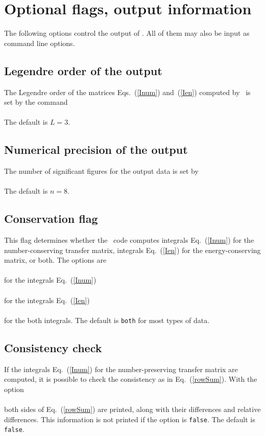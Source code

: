 \section{Optional flags, output information}
\label{Sec:usage-optional}
The following options control the output of \gettransfer.
All of them may also be input as command line options.

\subsection{Legendre order of the output}\label{Sec:LegendreOrder}
The Legendre order of the matrices Eqs.~(\ref{Inum}) and~(\ref{Ien})
computed by \gettransfer\ is set by the command\\
  \\
The default is $L = 3$.

\subsection{Numerical precision of the output}
The number of significant figures for the output data is set by\\
  \\
The default is $n = 8$.

\subsection{Conservation flag}\label{Sec:conserveFlag}
This flag determines whether the \gettransfer\ code computes integrals
   Eq.~(\ref{Inum}) for the number-conserving transfer matrix,
   integrals  Eq.~(\ref{Ien}) for the energy-conserving matrix, or both.
   The options are\\
   \\
for the integrals Eq.~(\ref{Inum})\\
   \\
for the integrals Eq.~(\ref{Ien})\\
   \\
for the both integrals.  The default is \texttt{both} for most types of data.

\subsection{Consistency check}
If the integrals Eq.~(\ref{Inum}) for the number-preserving transfer matrix
are computed, it is possible to check the consistency as in Eq.~(\ref{rowSum}).
With the option\\
  \\
both sides of Eq.~(\ref{rowSum}) are printed, along with their differences
and relative differences.  This information is not printed if the option is \texttt{false}.
The default is \texttt{false}.

